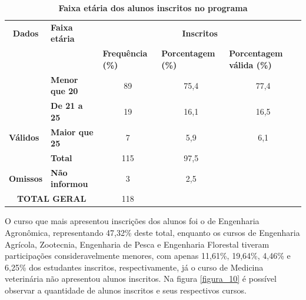 \begin{table}[!htb]
\caption{\textbf{Faixa etária dos alunos inscritos no programa}}
\label{tab:tabela_4}
\begin{tabular}{clccc}
\hline \hline
{\color[HTML]{000000} \textbf{Dados}} & {\color[HTML]{000000} \textbf{Faixa etária}} & \multicolumn{3}{c}{{\color[HTML]{000000} \textbf{Inscritos}}} \\ \cline{1-5}
{\color[HTML]{000000} } & {\color[HTML]{000000} } & \multicolumn{1}{l}{{\color[HTML]{000000} \textbf{Frequência (\%)}}} & \multicolumn{1}{l}{{\color[HTML]{000000} \textbf{Porcentagem (\%)}}} & \multicolumn{1}{l}{{\color[HTML]{000000} \textbf{Porcentagem válida (\%)}}} \\
{\color[HTML]{000000} } & {\color[HTML]{000000} \textbf{Menor que 20}} & {\color[HTML]{000000} 89} & {\color[HTML]{000000} 75,4} & {\color[HTML]{000000} 77,4}\\[8pt]
\multirow{-3}{*}{{\color[HTML]{000000} \textbf{}}} & {\color[HTML]{000000} \textbf{De 21 a 25}} & {\color[HTML]{000000} 19} & {\color[HTML]{000000} 16,1} & {\color[HTML]{000000} 16,5} \\[8pt]
\multicolumn{1}{l}{{\color[HTML]{000000} \textbf{Válidos}}} & {\color[HTML]{000000} \textbf{Maior que 25}} & {\color[HTML]{000000} 7} & {\color[HTML]{000000} 5,9} & {\color[HTML]{000000} 6,1}\\[8pt]
\multicolumn{1}{l}{{\color[HTML]{000000} \textbf{}}} & {\color[HTML]{000000} \textbf{Total}} & {\color[HTML]{000000} 115} & {\color[HTML]{000000} 97,5} & {\color[HTML]{000000} } \\[8pt]\hline
\multicolumn{1}{l}{{\color[HTML]{000000} \textbf{Omissos}}} & {\color[HTML]{000000} \textbf{Não informou}} & {\color[HTML]{000000} 3} & {\color[HTML]{000000} 2,5} & {\color[HTML]{000000} } \\[8pt] \hline
\multicolumn{2}{c}{{\color[HTML]{000000} \textbf{TOTAL GERAL}}} & {\color[HTML]{000000} 118} & {\color[HTML]{000000} } & {\color[HTML]{000000} } \\ \hline\hline
\end{tabular}
\end{table}



O curso que mais apresentou inscrições dos alunos foi o de Engenharia Agronômica, representando 47,32\% deste total, enquanto os cursos de Engenharia Agrícola, Zootecnia, Engenharia de Pesca e Engenharia Florestal tiveram participações consideravelmente menores, com apenas 11,61\%, 19,64\%, 4,46\% e 6,25\% dos estudantes inscritos, respectivamente, já o curso de Medicina veterinária não apresentou alunos inscritos. Na figura  \ref{figura_10} é possível observar a quantidade de alunos inscritos e seus respectivos cursos.



